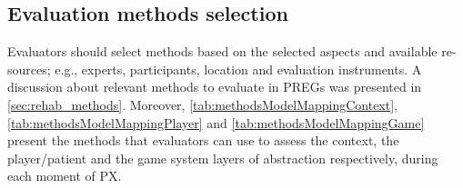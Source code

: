 \begin{table}[htb]
\caption{Aspects to evaluate the game system layer over time}
\label{tab:aspectsModelMappingGame}
\myfloatalign
{}
\end{table}

\subsection{Evaluation methods selection}
Evaluators should select methods based on the selected aspects and available re-sources; e.g., experts, participants, location and evaluation instruments. A discussion about relevant methods to evaluate in \acp{PREG} was presented in \autoref{sec:rehab_methods}. Moreover, \autoref{tab:methodsModelMappingContext}, \autoref{tab:methodsModelMappingPlayer} and \autoref{tab:methodsModelMappingGame} present the methods that evaluators can use to assess the context, the player/patient and the game system layers of abstraction respectively, during each moment of \ac{PX}.


